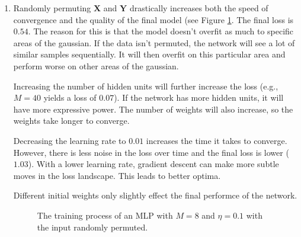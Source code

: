 \documentclass[a4paper]{article}
\begin{document}
\begin{enumerate}
\item Randomly permuting $\bm{X}$ and $\bm{Y}$ drastically increases both the speed of convergence and the quality of the final model (see Figure \ref{fig:perm}. The final loss is $0.54$. The reason for this is that the model doesn't overfit as much to specific areas of the gaussian. If the data isn't permuted, the network will see a lot of similar samples sequentially. It will then overfit on this particular area and perform worse on other areas of the gaussian.

Increasing the number of hidden units will further increase the loss (e.g., $M=40$ yields a loss of $0.07$). If the network has more hidden units, it will have more expressive power. The number of weights will also increase, so the weights take longer to converge.

Decreasing the learning rate to $0.01$ increases the time it takes to converge. However, there is less noise in the loss over time and the final loss is lower ($1.03$). With a lower learning rate, gradient descent can make more subtle moves in the loss landscape. This leads to better optima.

Different initial weights only slightly effect the final performce of the network.

\begin{figure}
\centering
{}
\caption{The training process of an MLP with $M=8$ and $\eta=0.1$ with the input randomly permuted.}
\label{fig:perm}
\end{figure}


\end{enumerate}
\end{document}
